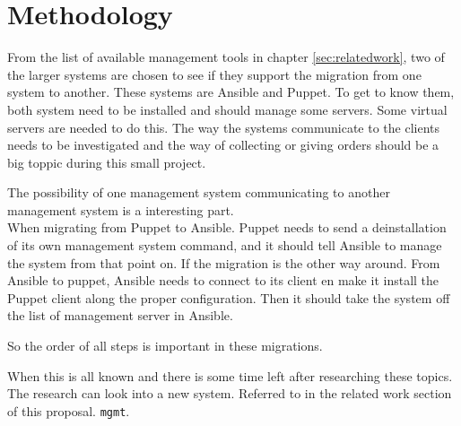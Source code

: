 \section{Methodology}\label{sec:method}
From the list of available management tools in chapter \ref{sec:relatedwork}, two of the larger systems are chosen to see if they support the migration from one system to another. These systems are Ansible\cite{whatisansible} and Puppet\cite{whatispuppet}. To get to know them, both system need to be installed and should manage some servers. Some virtual servers are needed to do this. The way the systems communicate to the clients needs to be investigated and the way of collecting or giving orders should be a big toppic during this small project. 

The possibility of one management system communicating to another management system is a interesting part. \\
When migrating from Puppet to Ansible. Puppet needs to send a deinstallation of its own management system command, and it should tell Ansible to manage the system from that point on. If the migration is the other way around. From Ansible to puppet, Ansible needs to connect to its client en make it install the Puppet client along the proper configuration. Then it should take the system off the list of management server in Ansible. 

So the order of all steps is important in these migrations. 

When this is all known and there is some time left after researching these topics. The research can look into a new system. Referred to in the related work section of this proposal. \texttt{mgmt}.

